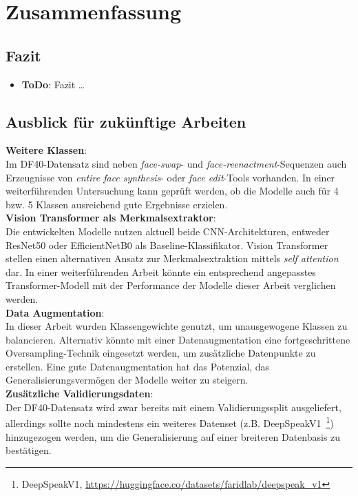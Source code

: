 \documentclass{article}
\newcommand{\resnet}{ResNet50\xspace}
\newcommand{\effnet}{EfficientNetB0\xspace}
\begin{document}
\section{Zusammenfassung}
\subsection{Fazit}
\begin{itemize}
    \item \textbf{ToDo}: Fazit \dots
\end{itemize}

\subsection{Ausblick für zukünftige Arbeiten}
\textbf{Weitere Klassen}:\\
Im DF40-Datensatz sind neben \textit{face-swap}- und \textit{face-reenactment}-Sequenzen auch Erzeugnisse von \textit{entire face synthesis}- oder \textit{face edit}-Tools vorhanden.
In einer weiterführenden Untersuchung kann geprüft werden, ob die Modelle auch für 4 bzw. 5 Klassen ausreichend gute Ergebnisse erzielen.
\\[0.5em]
\textbf{Vision Transformer als Merkmalsextraktor}:\\
Die entwickelten Modelle nutzen aktuell beide CNN-Architekturen, entweder \resnet oder \effnet als Baseline-Klassifikator.
Vision Transformer stellen einen alternativen Ansatz zur Merkmalsextraktion mittels \textit{self attention} dar.
In einer weiterführenden Arbeit könnte ein entsprechend angepasstes Transformer-Modell mit der Performance der Modelle dieser Arbeit verglichen werden.  
\\[0.5em]
\textbf{Data Augmentation}:\\
In dieser Arbeit wurden Klassengewichte genutzt, um unausgewogene Klassen zu balancieren.
Alternativ könnte mit einer Datenaugmentation eine fortgeschrittene Oversampling-Technik eingesetzt werden, um zusätzliche Datenpunkte zu erstellen.
Eine gute Datenaugmentation hat das Potenzial, das Generalisierungsvermögen der Modelle weiter zu steigern.
\\[0.5em]
\textbf{Zusätzliche Validierungsdaten}:\\
Der DF40-Datensatz wird zwar bereits mit einem Validierungssplit ausgeliefert, allerdings sollte noch mindestens ein weiteres Datenset (z.B. DeepSpeakV1~\footnote{DeepSpeakV1, \url{https://huggingface.co/datasets/faridlab/deepspeak_v1}}) hinzugezogen werden, um die Generalisierung auf einer breiteren Datenbasis zu bestätigen.
\end{document}
